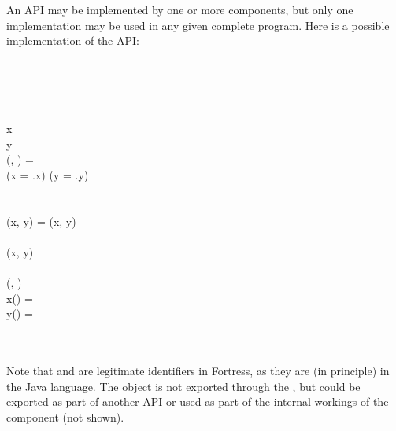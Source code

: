 An API may be implemented by one or more components, but only one implementation
may be used in any given complete program.  Here is a possible implementation of
the  API:
\begin{codeexamplesize}
\begin{FortressCode}
  \\
  \\
 \\
  \\
\2\+x\COLON {} \\
  y\COLON {} \\
  (, \COLON {})\COLON {} = \\
  \2\+(x = .x) \wedge (y = .y)\-\- \\
 \\
 \\
(x\COLON {}, y\COLON {}) = (x, y) \\
 \\
 (x\COLON {}, y\COLON {})    \\
 \\
 (\rho\COLON {}, \theta\COLON {})   \\
\2\+ x(\ultrathin) = \rho\, \cos\, \theta \\
   y(\ultrathin) = \rho\, \sin\, \theta\- \\
 \\
 \\
 
\end{FortressCode}
\end{codeexamplesize}
Note that \EXP{\rho} and \EXP{\theta} are legitimate identifiers in Fortress,
as they are (in principle) in the Java language.  The object
 is not exported through the , but could be
exported as part of another API or used as part of the internal
workings of the component (not shown).


